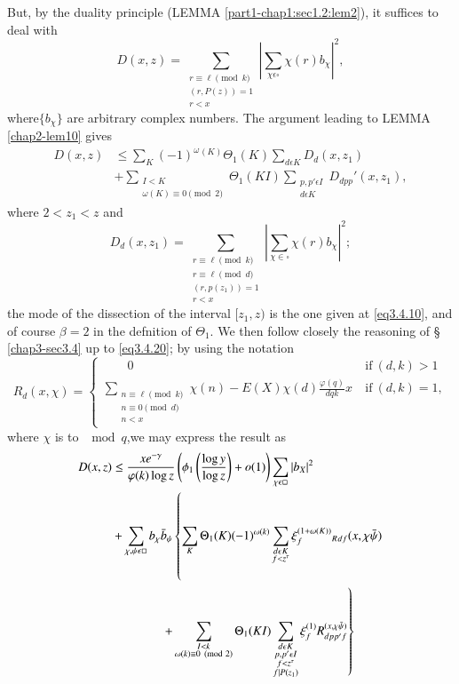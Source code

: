 But, by the duality principle (LEMMA \ref{part1-chap1:sec1.2:lem2}),
it suffices to deal with 
$$
  D(x,z) = \sum_{\substack{ r \equiv \ell \pmod{k} \\ (r,P(z)) = 1
      \\ r < x}} |\sum_{\chi \epsilon  \square } \chi(r)b_\chi|^2, 
$$
where\pageoriginale $\{b_\chi\}$ are arbitrary complex numbers. The
argument leading to 
LEMMA \ref{chap2-lem10} gives 
\begin{align*}
  D(x,z) & \le \sum_{K} (-1)^\omega{^{{(K)}}} \Theta_1 (K) \sum_{d
    \epsilon  K} D_d (x,z_1)\\ 
  & + \sum_{\substack{I < K\\ \omega(K) \equiv 0 \pmod{2}}} \Theta_1
  (KI) \sum_{\substack{p,p' \epsilon  I\\ d \epsilon  K}} D_{dpp}'
  (x,z_1), 
\end{align*}
where $2 < z_1 < z $ and
$$
 D_d (x,z_1) = \sum_{\substack{r \equiv \ell \pmod{k} \\ r \equiv \ell
     \pmod{d} \\ (r,p (z_1)) = 1\\r < x}} | \sum_{\chi \in \square } \chi
 (r) b_\chi |^2; 
$$
the mode of the dissection of the interval [$z_1,z)$ is the one given
  at \eqref{eq3.4.10}, and of course $\beta=2$ in the defnition of
  $\Theta_1$. We then follow closely the reasoning of \S~
  \ref{chap3-sec3.4} up to 
  \eqref{eq3.4.20}; by using the notation 
\begin{equation*}
  R_d (x, \chi)=
  \begin{cases}
    \qquad 0  & ~\text{if}~ (d,k) > 1\\
    \sum \limits_{\substack{n \equiv \ell \pmod{k} \\ n \equiv 0
        \pmod{d}\\ n < x}}{\chi(n) -E (X) \chi (d) \frac{\varphi(q)} {dqk}} x&
    ~\text{if}~ (d,k) = 1, 
  \end{cases}
\end{equation*}
where $\chi$ is to $\mod q$,we may express the result as
\begin{align*}
  D (x,z) & \le \frac{x e^{-\gamma}}{\varphi (k) \log z}
  \left(\phi_1\left(\frac{\log y} {\log z}\right) + o (1)\right)
  \sum_{\chi \epsilon  \square } |b_X|^2\\ 
  & + \sum_{\chi, \psi \epsilon  \square } b_\chi \bar{b}_ \psi \left\{
  \sum_K \Theta_1 (K)(-1)^{\omega(k)} \sum_{\substack{d \epsilon 
      K\\ f < z^\tau}} \xi_f^{(1+\omega(K))}{_R{_{df}}} (x, \chi
  \bar{\psi}) \vphantom{\sum_{\substack{d \epsilon  K\\ p,p' \epsilon  I \\ f <
      z^\tau \\ f|P(z_1)}}} \right. \\ 
  & \qquad \qquad \left.+ \sum_{\substack{I < k\\ \omega(k) \equiv 0
      \pmod{2}}} \Theta_1 (KI) \sum_{\substack{d \epsilon  K\\ p,p'
      \epsilon  I \\ f < z^\tau \\ f|P(z_1)}} \xi_f^{(1)} R_{dpp'f}^{(x,\chi
    \bar{\psi})}\right\} 
\end{align*}\pageoriginale
